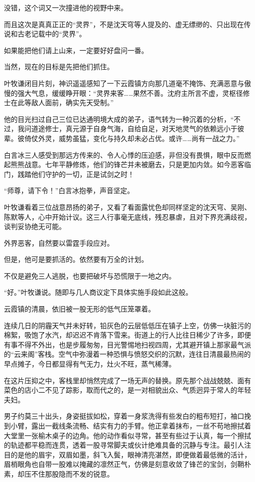 没错，这个词又一次撞进他的视野中来。

而且这次是真真正正的“灵界”，不是沈天穹等人提及的、虚无缥缈的、只出现在传说和古老记载中的“灵界”。

如果能把他们请上山来，一定要好好盘问一番。

当然，现在的目标是先把他们抓住。

叶牧谦闭目片刻，神识遥遥感知了一下云霞镇方向那几道毫不掩饰、充满恶意与傲慢的强大气息，缓缓睁开眼：“灵界来客……果然不善。沈府主所言不虚，灵枢径修士在此等敌人面前，确实先天受制。”

他的目光扫过自己三位已达通明境大成的弟子，语气转为一种沉着的分析，“不过，我问道途修士，真元源于自身气海，自给自足，对天地灵气的依赖远小于彼辈。彼倚仗外灵，威势虽猛，变化与持久却未必占优。或许……尚有一战之力。”

白言冰三人感受到那远方传来的、令人心悸的压迫感，非但没有畏惧，眼中反而燃起熊熊战意。七年平静修炼，他们的锋芒并未被磨去，只是更加内敛。如今恶客临门，践踏他们守护的一切，正是试剑之时！

“师尊，请下令！”白言冰抱拳，声音坚定。

叶牧谦看着三位战意昂扬的弟子，又看了看面露忧色却同样坚定的沈天穹、吴刚、陈默等人，心中开始计议。这三人行事毫无底线，残忍暴虐，且对下界充满歧视，谈判妥协绝无可能。

外界恶客，自然要以雷霆手段应对。

但是，他可是要抓活的。依然要有万全的计划。

不仅是避免三人逃脱，也要把破坏与恐慌限于一地之内。

“好。”叶牧谦说。随即与几人商议定下具体实施手段如此这般。

\vspace{2em}

云霞镇的清晨，依旧被一股无形的低气压笼罩着。

连续几日的阴霾天气并未好转，铅灰色的云层低低压在镇子上空，仿佛一块脏污的棉絮，吸饱了水汽，却迟迟不肯落下雪来。街道上的行人比往日稀少了许多，即便有事不得不外出，也是步履匆匆，目光警惕地扫视四周，尤其避开镇上那家最气派的“云来阁”客栈。空气中弥漫着一种恐惧与愤怒交织的沉默，连往日清晨最热闹的早点摊子，今日都显得有气无力，灶火不旺，蒸气稀薄。

在这片压抑之中，客栈里却悄然完成了一场无声的替换。原先那个战战兢兢、面有菜色的店小二不见了踪影，取而代之的，是一对相貌出众、气质迥异于常人的年轻夫妇。

男子约莫三十出头，身姿挺拔如松，穿着一身浆洗得有些发白的粗布短打，袖口挽到小臂，露出一截线条流畅、结实有力的手臂。他正拿着抹布，一丝不苟地擦拭着大堂里一张榆木桌子的边角。他的动作看似寻常，甚至有些过于认真，每一个擦拭的轨迹都平稳而连贯，透着一股寻常脚夫或伙计绝难具备的沉静与专注。最引人注目的是他的眉宇，双眉如墨，斜飞入鬓，眼神清亮湛然，即便做着最低微的活计，眉梢眼角也自带一股难以掩藏的凛然正气，仿佛是刻意收敛了锋芒的宝剑，剑鞘朴素，却压不住那股隐而不发的锐意。

